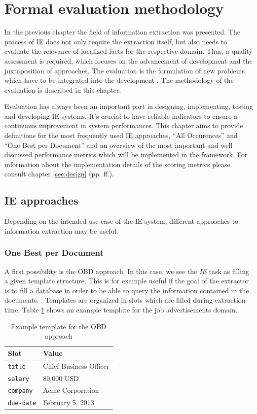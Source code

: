 \section{Formal evaluation methodology}
\label{sec:evaluation-methodology}

In the previous chapter the field of information extraction was presented. The process of IE does not only require the extraction itself, but also needs to evaluate the relevance of localized facts for the respective domain. Thus, a quality assessment is required, which focuses on the advancement of development and the juxtaposition of approaches. The evaluation is the formulation of new problems which have to be integrated into the development \cite{Linsmayr:2010}. The methodology of the evaluation is described in this chapter.

Evaluation has always been an important part in designing, implementing, testing and developing \gls{IE} systems. It's crucial to have reliable indicators to ensure a continuous improvement in system performances. This chapter aims to provide definitions for the most frequently used \gls{IE} approaches, \enquote{All Occurences} and \enquote{One Best per Document} and an overview of the most important and well discussed performance metrics which will be implemented in the framework. For information about the implementation details of the scoring metrics please consult chapter \ref{sec:design} (pp. \pageref{sec:design}ff.).

\subsection{\gls{IE} approaches}
\label{sec:ie-approaches}
Depending on the intended use case of the IE system, different approaches to information extraction may be useful. 

\subsubsection{One Best per Document}A first possibility is the \gls{OBD} approach. In this case, we see the \textit{IE} task as filling a given template structure. This is for example useful if the goal of the extractor is to fill a database in order to be able to query the information contained in the documents. \cite{Sitter:2004}. Templates are organized in slots which are filled during extraction time. Table \ref{tbl:example-obd} shows an example template for the job advertisements domain.

\begin{table}[H]
\centering
\begin{tabular*}{\textwidth}{ll}
	\toprule
	Slot & Value \\
	\midrule
	\texttt{title} & Chief Business Officer \\
	\texttt{salary} & 80,000 USD \\
	\texttt{company} & Acme Corporation \\
	\texttt{due-date} & February 5, 2013 \\
	\bottomrule
\end{tabular*}
\caption{Example template for the \gls{OBD} approach}
\label{tbl:example-obd}
\end{table}

